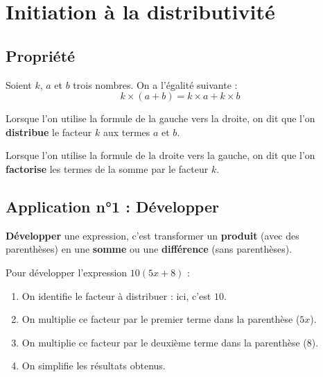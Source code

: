 \documentclass[a4paper]{book}
\begin{document}
\section{Initiation à la distributivité}
\subsection{Propriété}

    \begin{propriete}
        Soient $k$, $a$ et $b$ trois nombres. On a l'égalité suivante :
        \[ k \times (a + b) = k \times a + k \times b \]
        
        Lorsque l'on utilise la formule de la gauche vers la droite, on dit que l'on \textbf{distribue} le facteur $k$ aux termes $a$ et $b$.

        \medskip

        Lorsque l'on utilise la formule de la droite vers la gauche, on dit que l'on \textbf{factorise} les termes de la somme par le facteur $k$.
    \end{propriete}
    

\subsection{Application n°1 : Développer}
    \begin{definition}[Développer]
        \textbf{Développer} une expression, c'est transformer un \textbf{produit} (avec des parenthèses) en une \textbf{somme} ou une \textbf{différence} (sans parenthèses).
    \end{definition}
    
    
    \begin{methode}
        Pour développer l'expression $10(5x + 8)$ :
        \begin{enumerate}
            \item On identifie le facteur à distribuer : ici, c'est $10$.
            \item On multiplie ce facteur par le premier terme dans la parenthèse ($5x$).
            \item On multiplie ce facteur par le deuxième terme dans la parenthèse ($8$).
            \item On simplifie les résultats obtenus.
        \end{enumerate}
    \end{methode}
    
\end{document}
